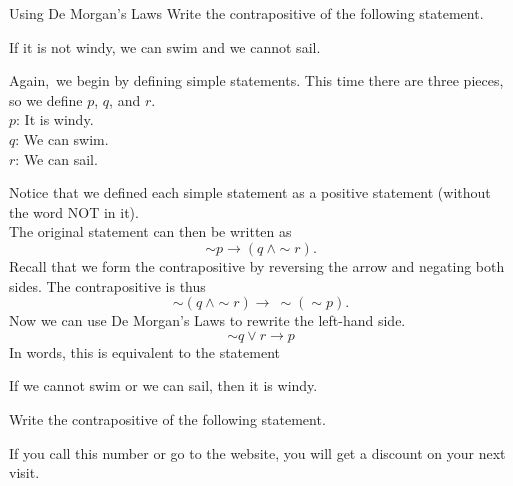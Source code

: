 \begin{example}[https://www.youtube.com/watch?v=VAPnT_9vxds]{Using De Morgan's Laws}
Write the contrapositive of the following statement.
\begin{center}
If it is not windy, we can swim and we cannot sail.
\end{center}

Again,\sol\ we begin by defining simple statements.  This time there are three pieces, so we define $p$, $q$, and $r$.\\
$p$: It is windy.\\
$q$: We can swim.\\
$r$: We can sail.

Notice that we defined each simple statement as a positive statement (without the word NOT in it).\\

The original statement can then be written as \[\sim p \to (q\ \wedge \sim r).\]
Recall that we form the contrapositive by reversing the arrow and negating both sides.  The contrapositive is thus
\[\sim (q\ \wedge \sim r) \to\ \sim (\sim p).\]
Now we can use De Morgan's Laws to rewrite the left-hand side.
\[\sim q \vee r \to p\]
In words, this is equivalent to the statement
\begin{center}
If we cannot swim or we can sail, then it is windy.
\end{center}
\end{example}

\begin{try}
Write the contrapositive of the following statement.
\begin{center}
If you call this number or go to the website, you will get a discount on your next visit.
\end{center}
\end{try}

